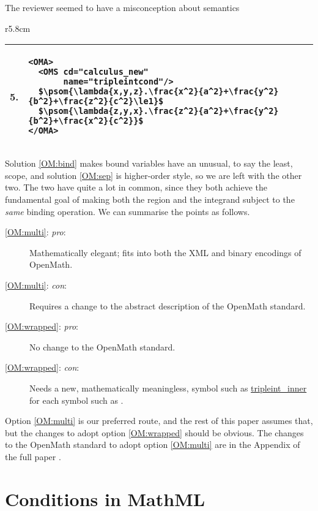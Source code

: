 \documentclass{llncs}
\begin{document}
\begin{newpart}{The reviewer seemed to have a misconception about semantics}
\begin{wrapfigure}r{5.8cm}\vspace*{-2em}
\lstset{mathescape,numbers=none,frame=none,aboveskip=-.7em,belowskip=-1.3em}
\begin{tabular}{|l|p{5cm}|}\hline
5.& 
\begin{lstlisting}[mathescape]
<OMA>
  <OMS cd="calculus_new" 
       name="tripleintcond"/>
  $\psom{\lambda{x,y,z}.\frac{x^2}{a^2}+\frac{y^2}{b^2}+\frac{z^2}{c^2}\le1}$
  $\psom{\lambda{z,y,x}.\frac{z^2}{a^2}+\frac{y^2}{b^2}+\frac{x^2}{c^2}}$
</OMA>
\end{lstlisting}\\\hline
\end{tabular}\vspace*{-2.2em}
\end{wrapfigure}
Solution \ref{OM:bind} makes bound variables have an unusual, to say the least, scope, and
solution \ref{OM:sep} is higher-order style, so we are left with the other two. The two
have quite a lot in common, since they both achieve the fundamental goal of making both
the region and the integrand subject to the {\emph{same}} binding operation. We can
summarise the points as follows.
\begin{description}
\item[\ref{OM:multi}: \emph{pro}:]Mathematically elegant; fits into both the
XML and binary encodings of OpenMath.
\item[\ref{OM:multi}: \emph{con}:]Requires a change to the abstract
description of the OpenMath standard.
\item[\ref{OM:wrapped}: \emph{pro}:]No change to the OpenMath standard.
\item[\ref{OM:wrapped}: \emph{con}:]Needs a new, mathematically meaningless,
symbol such as \url{tripleint_inner} for each symbol such as
{}.
\end{description}
Option \ref{OM:multi} is our preferred route, and the rest of this paper assumes that, but
the changes to adopt option \ref{OM:wrapped} should be obvious. The changes to the
OpenMath standard to adopt option \ref{OM:multi} are in the Appendix\iffull\else{} of the
full paper \cite{DavenportKohlhase2009b}\fi.

\section{Conditions in MathML}


\end{newpart}
\end{document}
